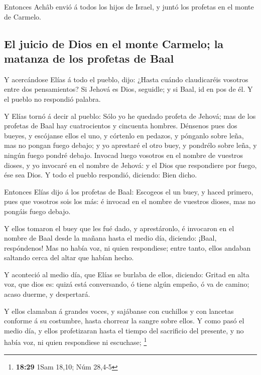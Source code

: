  Entonces Achâb envió á todos los hijos de Israel, y juntó
los profetas en el monte de Carmelo.

\hypertarget{el-juicio-de-dios-en-el-monte-carmelo-la-matanza-de-los-profetas-de-baal}{%
\subsection{El juicio de Dios en el monte Carmelo; la matanza de los
profetas de
Baal}\label{el-juicio-de-dios-en-el-monte-carmelo-la-matanza-de-los-profetas-de-baal}}

 Y acercándose Elías á todo el pueblo, dijo: ¿Hasta cuándo
claudicaréis vosotros entre dos pensamientos? Si Jehová es Dios,
seguidle; y si Baal, id en pos de él. Y el pueblo no respondió palabra.

 Y Elías tornó á decir al pueblo: Sólo yo he quedado
profeta de Jehová; mas de los profetas de Baal hay cuatrocientos y
cincuenta hombres.  Dénsenos pues dos bueyes, y escójanse
ellos el uno, y córtenlo en pedazos, y pónganlo sobre leña, mas no
pongan fuego debajo; y yo aprestaré el otro buey, y pondrélo sobre leña,
y ningún fuego pondré debajo.  Invocad luego vosotros en el
nombre de vuestros dioses, y yo invocaré en el nombre de Jehová: y el
Dios que respondiere por fuego, ése sea Dios. Y todo el pueblo
respondió, diciendo: Bien dicho.

 Entonces Elías dijo á los profetas de Baal: Escogeos el un
buey, y haced primero, pues que vosotros sois los más: é invocad en el
nombre de vuestros dioses, mas no pongáis fuego debajo.

 Y ellos tomaron el buey que les fué dado, y aprestáronlo,
é invocaron en el nombre de Baal desde la mañana hasta el medio día,
diciendo: ¡Baal, respóndenos! Mas no había voz, ni quien respondiese;
entre tanto, ellos andaban saltando cerca del altar que habían hecho.

 Y aconteció al medio día, que Elías se burlaba de ellos,
diciendo: Gritad en alta voz, que dios es: quizá está conversando, ó
tiene algún empeño, ó va de camino; acaso duerme, y despertará.

 Y ellos clamaban á grandes voces, y sajábanse con
cuchillos y con lancetas conforme á su costumbre, hasta chorrear la
sangre sobre ellos.  Y como pasó el medio día, y ellos
profetizaran hasta el tiempo del sacrificio del presente, y no había
voz, ni quien respondiese ni escuchase; \footnote{\textbf{18:29} 1Sam
  18,10; Núm 28,4-5}

